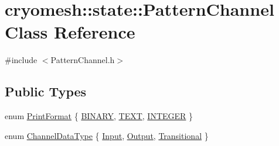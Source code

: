 \hypertarget{classcryomesh_1_1state_1_1PatternChannel}{\section{cryomesh\-:\-:state\-:\-:\-Pattern\-Channel \-Class \-Reference}
\label{classcryomesh_1_1state_1_1PatternChannel}
}


{\ttfamily \#include $<$\-Pattern\-Channel.\-h$>$}

\subsection*{\-Public \-Types}
\begin{DoxyCompactItemize}
\item 
enum \hyperlink{classcryomesh_1_1state_1_1PatternChannel_aecb6feb12b771abb3cca4a77f5a47903}{\-Print\-Format} \{ \hyperlink{classcryomesh_1_1state_1_1PatternChannel_aecb6feb12b771abb3cca4a77f5a47903ac9ab380f74b4a50f13013e4785cf9e41}{\-B\-I\-N\-A\-R\-Y}, 
\hyperlink{classcryomesh_1_1state_1_1PatternChannel_aecb6feb12b771abb3cca4a77f5a47903a323e9e3c328769d1ef777f10b3a2315b}{\-T\-E\-X\-T}, 
\hyperlink{classcryomesh_1_1state_1_1PatternChannel_aecb6feb12b771abb3cca4a77f5a47903a95004c9c6007ed3c766a5e6cec3ed521}{\-I\-N\-T\-E\-G\-E\-R}
 \}
\item 
enum \hyperlink{classcryomesh_1_1state_1_1PatternChannel_ac8a0ae515a221519890fc1181f2c895a}{\-Channel\-Data\-Type} \{ \hyperlink{classcryomesh_1_1state_1_1PatternChannel_ac8a0ae515a221519890fc1181f2c895aab75202b529e4a7cfb8db3daa14b9f477}{\-Input}, 
\hyperlink{classcryomesh_1_1state_1_1PatternChannel_ac8a0ae515a221519890fc1181f2c895aa981b9873565a0888e43eef95b4d003bf}{\-Output}, 
\hyperlink{classcryomesh_1_1state_1_1PatternChannel_ac8a0ae515a221519890fc1181f2c895aa4f561e33e002f951204ee1f01497f994}{\-Transitional}
 \}
\end{DoxyCompactItemize}
